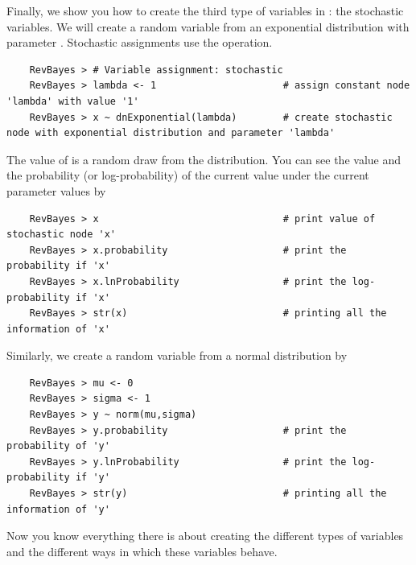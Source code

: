 Finally, we show you how to create the third type of variables in \Rev: the stochastic variables. 
We will create a random variable  from an exponential distribution with parameter .  
Stochastic assignments use the \cl{\rbdn} operation.
{\tt \begin{snugshade*}
\begin{lstlisting}    
    RevBayes > # Variable assignment: stochastic
    RevBayes > lambda <- 1                      # assign constant node 'lambda' with value '1'
    RevBayes > x ~ dnExponential(lambda)        # create stochastic node with exponential distribution and parameter 'lambda'
\end{lstlisting}
\end{snugshade*}}
The value of  is a random draw from the distribution. 
You can see the value and the probability (or log-probability) of the current value under the current parameter values by
{\tt \begin{snugshade*}
\begin{lstlisting}    
    RevBayes > x                                # print value of stochastic node 'x'
    RevBayes > x.probability                    # print the probability if 'x'
    RevBayes > x.lnProbability                  # print the log-probability if 'x'
    RevBayes > str(x)                           # printing all the information of 'x'
\end{lstlisting}
\end{snugshade*}}
Similarly, we create a random variable  from a normal distribution by
{\tt \begin{snugshade*}
\begin{lstlisting}    
    RevBayes > mu <- 0
    RevBayes > sigma <- 1
    RevBayes > y ~ norm(mu,sigma)	
    RevBayes > y.probability                    # print the probability of 'y'
    RevBayes > y.lnProbability                  # print the log-probability if 'y'
    RevBayes > str(y)                           # printing all the information of 'y'
\end{lstlisting}
\end{snugshade*}}
Now you know everything there is about creating the different types of variables and the different ways in which these variables behave.



